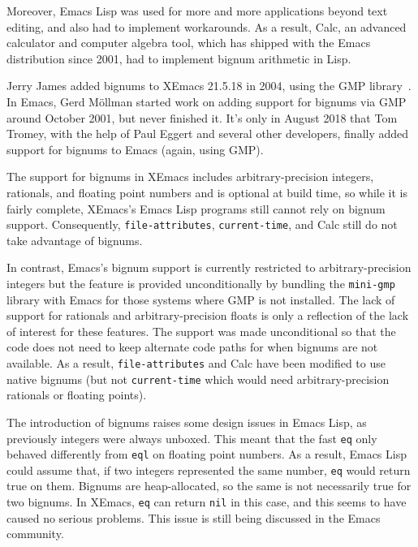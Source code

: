 \documentclass[format=acmsmall, review]{acmart}
\newcommand \Elisp {Emacs Lisp}
\begin{document}
Moreover, \Elisp{} was used for more and more applications beyond
text editing, and also had to implement workarounds.  As a result,
Calc, an advanced calculator and computer algebra tool, which has
shipped with the Emacs distribution since 2001, had to implement
bignum arithmetic in Lisp.

Jerry James added bignums to XEmacs 21.5.18 in 2004, using the GMP
library~\cite{GMP}.  In Emacs, Gerd Möllman started work on adding support
for bignums via GMP around October 2001, but never finished it.  It's only
in August 2018 that Tom Tromey, with the help of Paul Eggert and several
other developers, finally added support for bignums to Emacs (again, using
GMP).

The support for bignums in XEmacs includes arbitrary-precision integers,
rationals, and floating point numbers and is optional at build time, so
while it is fairly complete, XEmacs's \Elisp{} programs still cannot rely on
bignum support.  Consequently, \texttt{file-attributes},
\texttt{current-time}, and Calc still do not take advantage of bignums.

In contrast, Emacs's bignum support is currently restricted to
arbitrary-precision integers but the feature is provided unconditionally by
bundling the \texttt{mini-gmp} library with Emacs for those systems where
GMP is not installed.  The lack of support for rationals and
arbitrary-precision floats is only a reflection of the lack of interest for
these features.  The support was made unconditional so that the code does
not need to keep alternate code paths for when bignums are not available.
As a result, \texttt{file-attributes} and Calc have been modified to use
native bignums (but not \texttt{current-time} which would need
arbitrary-precision rationals or floating points).

The introduction of bignums raises some design issues in \Elisp, as
previously integers were always unboxed.  This meant that the fast
\texttt{eq} only behaved differently from \texttt{eql} on floating point
numbers.  As a result, \Elisp{} could assume that, if two integers
represented the same number, \texttt{eq} would return true on them.
Bignums are heap-allocated, so the same is not necessarily true for two
bignums.  In XEmacs, \texttt{eq} can return \texttt{nil} in this case, and
this seems to have caused no serious problems.
This issue is still being discussed in the Emacs community.


\end{document}
